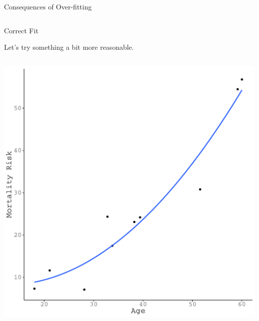 \documentclass{beamer}\usepackage[]{graphicx}\usepackage[]{color}
\makeatletter
\def\maxwidth{ %
  \ifdim\Gin@nat@width>\linewidth
    \linewidth
  \else
    \Gin@nat@width
  \fi
}
\newenvironment{knitrout}{}{} %
\makeatother
\begin{document}
\begin{frame}{Consequences of Over-fitting}
\begin{columns}
\begin{column}{0.5\textwidth}
\begin{knitrout}
{}



\end{knitrout}

\end{column}
\end{columns}

\end{frame}


\begin{frame}{Correct Fit}
  
  Let's try something a bit more reasonable.\\
  \vb
  \begin{columns}
    \begin{column}{0.5\textwidth}
      
\begin{knitrout}\footnotesize
{}\color{fgcolor}

{\centering \includegraphics[width=\maxwidth]{figure/unnamed-chunk-16-1} 

}



\end{knitrout}


\end{column}
\end{columns}
\end{frame}
\end{document}
